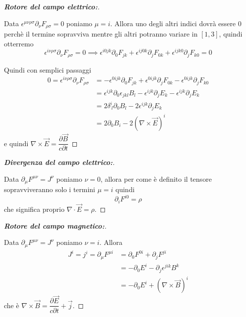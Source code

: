 \documentclass[12pt,a4paper,titlepage, twoside, openright]{book}
\newenvironment{proofT}[1][\proofname]{  %
  \begin{proof}[\bfseries #1:]$ $\par\nobreak\ignorespaces\noindent
  }{
  \end{proof}
}
\numberwithin{equation}{chapter}
\begin{document}
\begin{proofT}[Rotore del campo elettrico]
Data $\epsilon^{\mu\nu\rho\sigma}\partial_\nu F_{\rho\sigma}=0$ poniamo $\mu=i$. Allora uno degli altri indici dovrà essere $0$ perchè il termine sopravviva mentre gli altri potranno variare in $[1,3]$, quindi otterremo\footnotemark
\[
\epsilon^{i\nu\rho\sigma}\partial_\nu F_{\rho\sigma}=0 \implies
\epsilon^{i0jk}\partial_0 F_{jk} + 
\epsilon^{ij0k}\partial_j F_{0k} +
\epsilon^{ijk0}\partial_j F_{k0} = 0
\]

Quindi con semplici passaggi
\begin{align*}
0 = \epsilon^{i\nu\rho\sigma}\partial_\nu F_{\rho\sigma} & = 
-\epsilon^{0ijk}\partial_0 F_{jk} +
\epsilon^{0ijk}\partial_j F_{0k} 
-\epsilon^{0ijk}\partial_j F_{k0} 
\\
& =\epsilon^{ijk}\partial_0 \epsilon_{jkl}B_l 
-\epsilon^{ijk}\partial_j E_k 
-\epsilon^{ijk}\partial_j E_k 
\\
& =2\delta^{i}_{\> l}\partial_0 B_l  
-2\epsilon^{ijk}\partial_j E_k \\
& = 2\partial_0 B_i -2 \left( \nabla\times\vec{E} \right)^i
\end{align*}
e quindi $\nabla\times\vec{E}=\dfrac{\partial \vec{B}}{c \partial t}$
\end{proofT}


\begin{proofT}[Divergenza del campo elettrico]
Data $\partial_\mu F^{\mu\nu}=J^\nu$ poniamo $\nu=0$, allora per come è definito il tensore sopravviveranno solo i termini $\mu=i$ quindi
\[
\partial_i F^{i0}=\rho
\]
che significa proprio $\nabla\cdot\vec{E}=\rho$. \qedhere
\end{proofT}

\begin{proofT}[Rotore del campo magnetico]
Data $\partial_\mu F^{\mu\nu}=J^\nu$ poniamo $\nu=i$. Allora 
\begin{align*}
J^i=j^i=\partial_\mu F^{\mu i} & = \partial_0 F^{0i} + \partial_j F^{ji} \\
& = - \partial_0 E^i - \partial_j \epsilon^{jik}B^k \\
& = -\partial_0E^i + \left(\nabla\times\vec{B}\right)^i
\end{align*}
che è $\nabla\times\vec{B}=\dfrac{\partial \vec{E}}{c\partial t} + \vec{j} $. \qedhere
\end{proofT}
\end{document}
